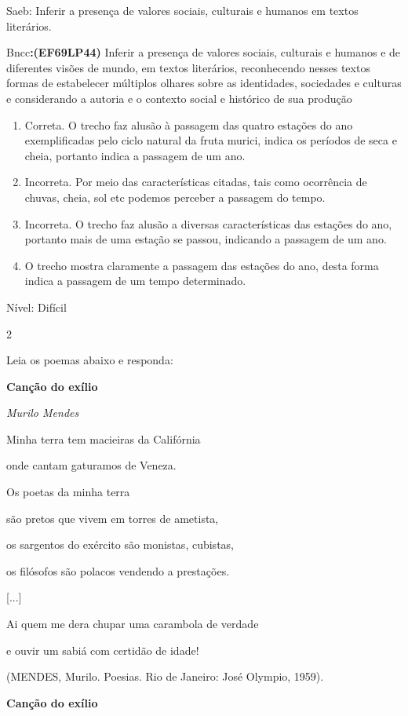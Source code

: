 {{\begin{escolha}
Saeb: Inferir a presença de valores sociais, culturais e humanos em
textos literários.

Bncc\textbf{:(EF69LP44)} Inferir a presença de valores sociais,
culturais e humanos e de diferentes visões de mundo, em textos
literários, reconhecendo nesses textos formas de estabelecer múltiplos
olhares sobre as identidades, sociedades e culturas e considerando a
autoria e o contexto social e histórico de sua produção

\begin{enumerate}
\def\labelenumi{\arabic{enumi}.}
\item
  Correta. O trecho faz alusão à passagem das quatro estações do ano
  exemplificadas pelo ciclo natural da fruta murici, indica os períodos
  de seca e cheia, portanto indica a passagem de um ano.
\item
  Incorreta. Por meio das características citadas, tais como ocorrência
  de chuvas, cheia, sol etc podemos perceber a passagem do tempo.
\item
  Incorreta. O trecho faz alusão a diversas características das estações
  do ano, portanto mais de uma estação se passou, indicando a passagem
  de um ano.
\item
  O trecho mostra claramente a passagem das estações do ano, desta forma
  indica a passagem de um tempo determinado.
\end{enumerate}

Nível: Difícil

\num{2}

Leia os poemas abaixo e responda:

\textbf{Canção do exílio}

\emph{Murilo Mendes}

Minha terra tem macieiras da Califórnia

onde cantam gaturamos de Veneza.

Os poetas da minha terra

são pretos que vivem em torres de ametista,

os sargentos do exército são monistas, cubistas,

os filósofos são polacos vendendo a prestações.

{[}...{]}

Ai quem me dera chupar uma carambola de verdade

e ouvir um sabiá com certidão de idade!

(MENDES, Murilo. Poesias. Rio de Janeiro: José Olympio, 1959).

\textbf{Canção do exílio}


\end{escolha}}}
